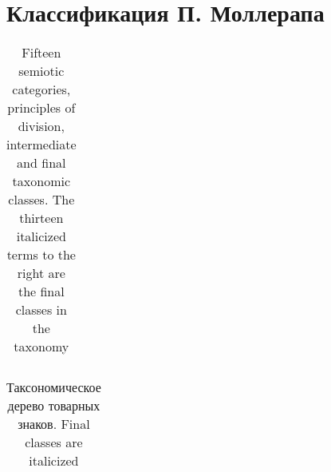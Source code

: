 \section{Классификация П. Моллерапа}
\label{app:mollerup}

\begin{table}
  \centering
  \begin{tabular}{|l|}
  \end{tabular}
  \caption{Fifteen semiotic categories, principles of division, intermediate and final taxonomic
    classes. The thirteen italicized terms to the right are the final classes in the taxonomy}
  \label{tab:mollerup1}
\end{table}

\begin{table}
  \centering
  \begin{tabular}{|l|}
  \end{tabular}
  \caption{Таксономическое дерево товарных знаков. Final classes are italicized}
  \label{tab:mollerup2}
\end{table}
